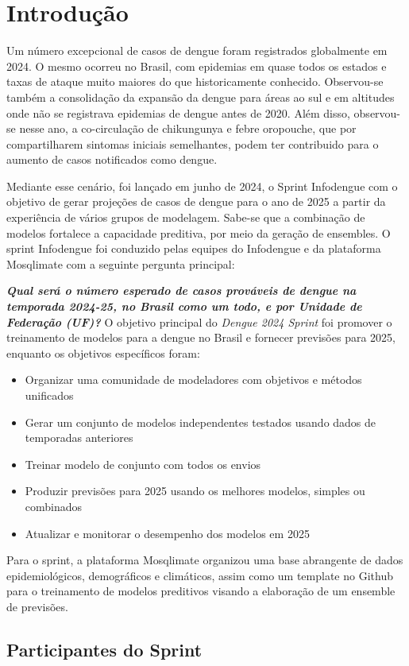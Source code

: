 \section{Introdução}

Um número excepcional de casos de dengue foram registrados globalmente em 2024. O mesmo ocorreu no Brasil, com epidemias em quase todos os estados e taxas de ataque muito maiores do que historicamente conhecido. Observou-se também a consolidação da expansão da dengue para áreas ao sul e em altitudes onde não se registrava epidemias de dengue antes de 2020. Além disso, observou-se nesse ano, a co-circulação de chikungunya e febre oropouche, que por compartilharem sintomas iniciais semelhantes, podem ter contribuido para o aumento de casos notificados como dengue.

Mediante esse cenário, foi lançado em junho de 2024, o Sprint Infodengue com o objetivo de gerar projeções de casos de dengue para o ano de 2025 a partir da experiência de vários grupos de modelagem. Sabe-se que a combinação de modelos fortalece a capacidade preditiva, por meio da geração de ensembles. O sprint Infodengue foi conduzido pelas equipes do Infodengue e da plataforma Mosqlimate com a seguinte pergunta principal:

\textbf{\textit{Qual será o número esperado de casos prováveis de dengue na temporada 2024-25, no Brasil como um todo, e por Unidade de Federação (UF)?
}}
O objetivo principal do \textit{Dengue 2024 Sprint} foi promover o treinamento de modelos para a dengue no Brasil e fornecer previsões para 2025, enquanto os objetivos específicos foram: 

\begin{itemize}
    \item Organizar uma comunidade de modeladores com objetivos e métodos unificados 
    \item Gerar um conjunto de modelos independentes testados usando dados de temporadas anteriores 
    \item Treinar modelo de conjunto com todos os envios
    \item Produzir previsões para 2025 usando os melhores modelos, simples ou combinados 
    \item Atualizar e monitorar o desempenho dos modelos em 2025
\end{itemize}
 
Para o sprint, a plataforma Mosqlimate organizou uma base abrangente de dados epidemiológicos, demográficos e climáticos, assim como um template no Github para o treinamento de modelos preditivos visando a elaboração de um ensemble de previsões. 

\subsection{Participantes do Sprint}

